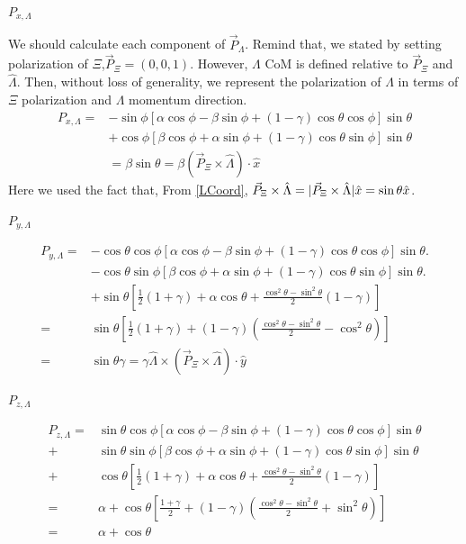 \documentclass[
	xcolor=dvipsnames,
	10pt, 
	]{beamer}
\begin{document}
\begin{frame}{$P_{x,\Lambda}$}
	\begin{block}{}
		We should calculate each component of $\vec{P}_\Lambda$. Remind that, we stated by setting polarization of $\Xi$,$\vec P_{\Xi}=(0,0,1)$. However, $\Lambda$ CoM is defined relative to  $\vec P_{\Xi}$ and $\hat\Lambda$. Then, without loss of generality, we represent the polarization of $\Lambda$ in terms of $\Xi$ polarization and $\Lambda$ momentum direction.
		\begin{align}
			P_{x,\Lambda} =& -\sin\phi[\alpha\cos\phi-\beta\sin\phi+ (1-\gamma)\cos\theta\cos\phi]\sin\theta\nonumber\\
			&+\cos\phi[\beta\cos\phi+\alpha\sin\phi+ (1-\gamma)\cos\theta\sin\phi]\sin\theta\nonumber\\
			&=\beta\sin\theta = \beta (\vec{P}_{\Xi}\times \hat\Lambda)\cdot \hat x\label{PLx}
		\end{align}
		Here we used the fact that, From \eqref{LCoord}, $\vec{P}_{\Xi}\times \hat\Lambda=|\vec P_{\Xi}\times\hat\Lambda|\hat x=\sin\theta\hat x$.
	\end{block}
\end{frame}
\begin{frame}{$P_{y,\Lambda}$}
	\begin{block}{}
		\begin{align}
				P_{y,\Lambda} =&-\cos\theta\cos\phi[\alpha\cos\phi-\beta\sin\phi+ (1-\gamma)\cos\theta\cos\phi]\sin\theta.\nonumber\\
				&-\cos\theta\sin\phi[\beta\cos\phi+\alpha\sin\phi+ (1-\gamma)\cos\theta\sin\phi]\sin\theta.
				\nonumber\\
				&+\sin\theta[\frac{1}{2}(1+\gamma) + \alpha\cos\theta  + \frac{\cos^2\theta-\sin^2\theta}{2}(1-\gamma)]\nonumber\\
				=&\sin\theta[\frac{1}{2}(1+\gamma)+(1-\gamma)(\frac{\cos^2\theta-\sin^2\theta}{2}-\cos^2\theta)]\nonumber\\
				=&\sin\theta\gamma = \gamma \hat \Lambda\times(\vec{P}_\Xi\times\hat\Lambda)\cdot \hat y\label{PLy}
		\end{align}
	\end{block}
\end{frame}
\begin{frame}{$P_{z,\Lambda}$}
	\begin{block}{}
		\begin{align}
			P_{z,\Lambda} =&\sin\theta\cos\phi [\alpha\cos\phi-\beta\sin\phi+ (1-\gamma)\cos\theta\cos\phi]\sin\theta\nonumber\\
			+&\sin\theta\sin\phi[\beta\cos\phi+\alpha\sin\phi+ (1-\gamma)\cos\theta\sin\phi]\sin\theta\nonumber\\
			+&\cos\theta[\frac{1}{2}(1+\gamma) + \alpha\cos\theta  + \frac{\cos^2\theta-\sin^2\theta}{2}(1-\gamma)]\nonumber\\
			=&\alpha+\cos\theta[\frac{1+\gamma}{2}+(1-\gamma)(\frac{\cos^2\theta-\sin^2\theta}{2}+\sin^2\theta)]\nonumber\\
			=&\alpha+\cos\theta\label{PLz}
		\end{align}
	\end{block}
\end{frame}
\end{document}
